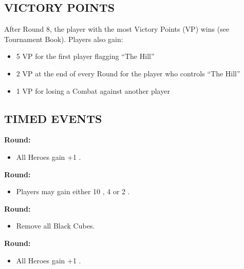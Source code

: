 \begin{multicols*}{2}
\subsection*{\MakeUppercase{Victory Points}}
After Round 8, the player with the most Victory Points (VP) wins (see Tournament Book). Players also gain:
\begin{itemize}
  \item 5 VP for the first player flagging ``The Hill''
  \item 2 VP at the end of every Round for the player who controls ``The Hill''
  \item 1 VP for losing a Combat against another player
\end{itemize}

\subsection*{\MakeUppercase{Timed Events}}

\textbf{ Round:}
\begin{itemize}
  \item All Heroes gain +1 .
\end{itemize}
\textbf{ Round:}
\begin{itemize}
  \item Players may gain either 10 , 4  or 2 .
\end{itemize}
\textbf{ Round:}
\begin{itemize}
  \item Remove all Black Cubes.
\end{itemize}
\textbf{ Round:}
\begin{itemize}
  \item All Heroes gain +1 .
\end{itemize}


\end{multicols*}
